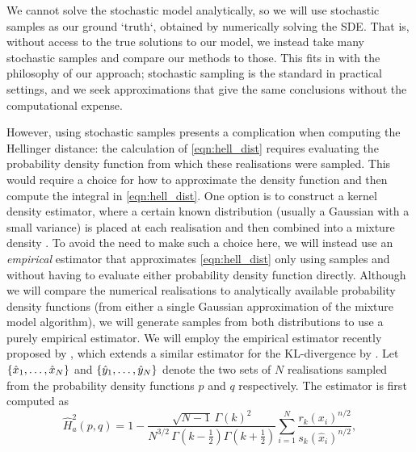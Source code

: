 We cannot solve the stochastic model analytically, so we will use stochastic samples as our ground `truth`, obtained by numerically solving the SDE. %
That is, without access to the true solutions to our model, we instead take many stochastic samples and compare our methods to those.
This fits in with the philosophy of our approach; stochastic sampling is the standard in practical settings, and we seek approximations that give the same conclusions without the computational expense.

However, using stochastic samples presents a complication when computing the Hellinger distance: the calculation of \cref{eqn:hell_dist} requires evaluating the probability density function from which these realisations were sampled.
This would require a choice for how to approximate the density function and then compute the integral in \cref{eqn:hell_dist}.
One option is to construct a kernel density estimator, where a certain known distribution (usually a Gaussian with a small variance) is placed at each realisation and then combined into a mixture density \citep{Silverman_2017_DensityEstimationStatistics}.
To avoid the need to make such a choice here, we will instead use an \emph{empirical} estimator that approximates \cref{eqn:hell_dist} only using samples and without having to evaluate either probability density function directly.
Although we will compare the numerical realisations to analytically available probability density functions (from either a single Gaussian approximation of the mixture model algorithm), we will generate samples from both distributions to use a purely empirical estimator.
We will employ the empirical estimator recently proposed by \citet{DingMullhaupt_2023_EmpiricalSquaredHellinger}, which extends a similar estimator for the KL-divergence by \citet{Perez-Cruz_2008_KullbackLeiblerDivergenceEstimation}. %
Let \(\set{\hat{x}_1, \dotsc, \hat{x}_N}\) and \(\set{\hat{y}_1, \dotsc, \hat{y}_N}\) denote the two sets of \(N\) realisations sampled from the probability density functions \(p\) and \(q\) respectively.
The estimator is first computed as
\begin{equation}\label{eqn:hell_emp_Ha}
	\hat{H}_a^2\!\left(p, q\right) = 1 - \frac{\sqrt{N - 1}\,\Gamma\!\left(k\right)^2}{N^{3/2}\,\Gamma\!\left(k - \frac12\right)\Gamma\!\left(k + \frac12\right)} \sum_{i=1}^{N}\frac{r_k\!\left(x_i\right)^{n/2}}{s_k\!\left(\hat{x}_i\right)^{n/2}},
\end{equation}
